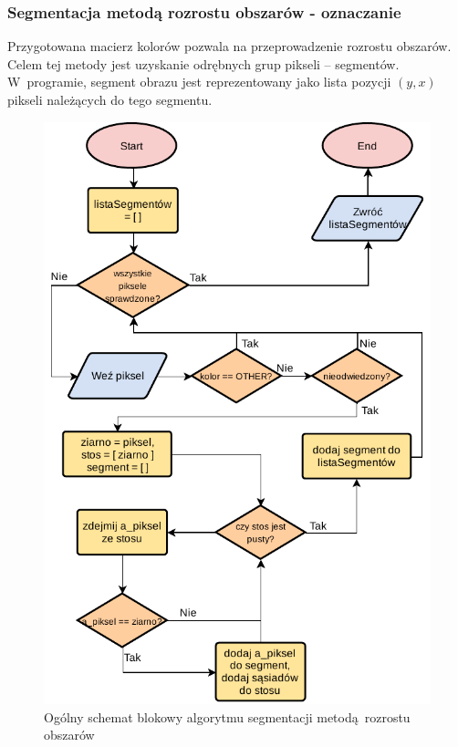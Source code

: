 \subsubsection{Segmentacja metodą rozrostu obszarów - oznaczanie}
Przygotowana macierz kolorów pozwala na przeprowadzenie rozrostu obszarów. Celem tej metody jest uzyskanie odrębnych grup pikseli -- segmentów. W~programie, segment obrazu jest reprezentowany jako lista pozycji $(y, x)$ pikseli należących do tego segmentu.

\begin{figure}[tb]
    \centering
    \includegraphics[width=\columnwidth]{figures/POBR-Segmentation.pdf}
    \caption{Ogólny schemat blokowy algorytmu segmentacji metodą rozrostu obszarów}
    \label{fig:segmentation-overview}
\end{figure}

